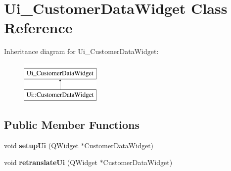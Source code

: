 \hypertarget{classUi__CustomerDataWidget}{\section{Ui\-\_\-\-Customer\-Data\-Widget Class Reference}
\label{classUi__CustomerDataWidget}
}
Inheritance diagram for Ui\-\_\-\-Customer\-Data\-Widget\-:\begin{figure}[H]
\begin{center}
\leavevmode
\includegraphics[height=2.000000cm]{d4/da3/classUi__CustomerDataWidget}
\end{center}
\end{figure}
\subsection*{Public Member Functions}
\begin{DoxyCompactItemize}
\item 
\hypertarget{classUi__CustomerDataWidget_a78ec707af3fefd2e6ac0241ced610a68}{void {\bfseries setup\-Ui} (Q\-Widget $\ast$Customer\-Data\-Widget)}\label{classUi__CustomerDataWidget_a78ec707af3fefd2e6ac0241ced610a68}

\item 
\hypertarget{classUi__CustomerDataWidget_acecb488aabd4eeddfe5ebcd097c4a7d7}{void {\bfseries retranslate\-Ui} (Q\-Widget $\ast$Customer\-Data\-Widget)}\label{classUi__CustomerDataWidget_acecb488aabd4eeddfe5ebcd097c4a7d7}

\end{DoxyCompactItemize}
